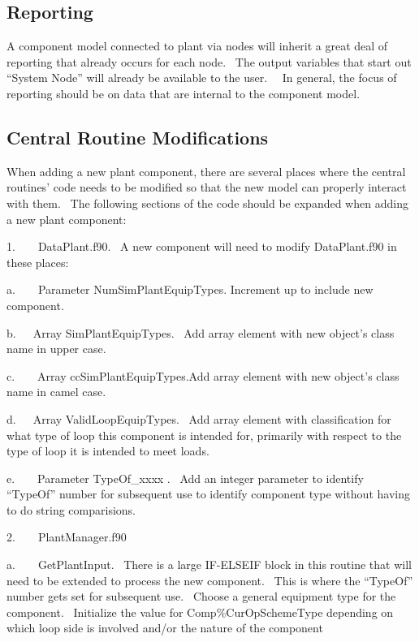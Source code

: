 \subsection{Reporting}\label{reporting}

A component model connected to plant via nodes will inherit a great deal of reporting that already occurs for each node.~ The output variables that start out ``System Node'' will already be available to the user.~~ In general, the focus of reporting should be on data that are internal to the component model.

\subsection{Central Routine Modifications}\label{central-routine-modifications}

When adding a new plant component, there are several places where the central routines' code needs to be modified so that the new model can properly interact with them.~ The following sections of the code should be expanded when adding a new plant component:

1.~~~~DataPlant.f90.~ A new component will need to modify DataPlant.f90 in these places:

a.~~~~Parameter NumSimPlantEquipTypes. Increment up to include new component.

b.~~~Array SimPlantEquipTypes.~ Add array element with new object's class name in upper case.

c.~~~~Array ccSimPlantEquipTypes.Add array element with new object's class name in camel case.

d.~~~Array ValidLoopEquipTypes.~ Add array element with classification for what type of loop this component is intended for, primarily with respect to the type of loop it is intended to meet loads.

e.~~~~Parameter TypeOf\_xxxx .~ Add an integer parameter to identify ``TypeOf'' number for subsequent use to identify component type without having to do string comparisions.

2.~~~~PlantManager.f90

a.~~~~GetPlantInput.~ There is a large IF-ELSEIF block in this routine that will need to be extended to process the new component.~ This is where the ``TypeOf'' number gets set for subsequent use.~ Choose a general equipment type for the component.~ Initialize the value for Comp\%CurOpSchemeType depending on which loop side is involved and/or the nature of the component


